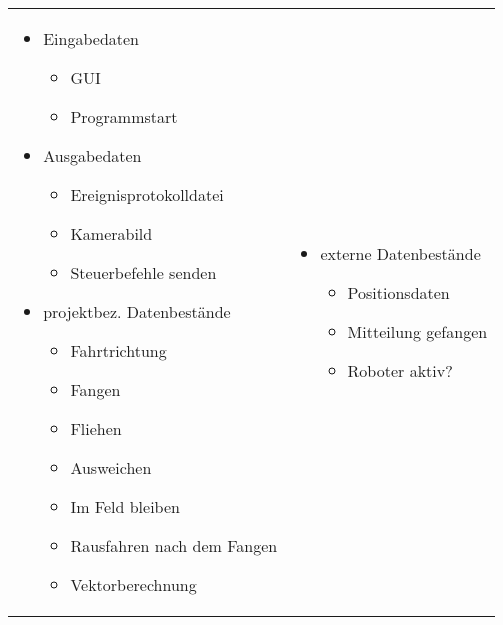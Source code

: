 \begin{tabular}{p{}p{}}
	\begin{itemize}
		\item Eingabedaten
		\begin{itemize}
			\item GUI
			\item Programmstart
		\end{itemize}
		\item Ausgabedaten
		\begin{itemize}
			\item Ereignisprotokolldatei
			\item Kamerabild
			\item Steuerbefehle senden
		\end{itemize}
		\item projektbez. Datenbestände
		\begin{itemize}
			\item Fahrtrichtung
			\item Fangen
			\item Fliehen
			\item Ausweichen
			\item Im Feld bleiben
			\item Rausfahren nach dem Fangen
			\item Vektorberechnung
		\end{itemize}
	\end{itemize} & 
	\begin{itemize}
		\item externe Datenbestände
		\begin{itemize}
			\item Positionsdaten
			\item Mitteilung gefangen
			\item Roboter aktiv?
		\end{itemize}
	\end{itemize}\\
\end{tabular}
\newpage
